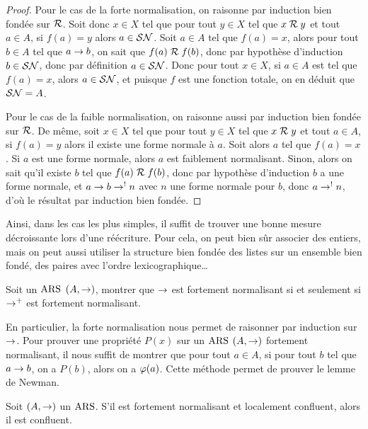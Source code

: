 \begin{proof}
  Pour le cas de la forte normalisation, on raisonne par induction bien
  fondée sur $\mathrel{\mathcal{R}}$. Soit donc $x \in X$ tel que pour tout $y\in X$ tel
  que $x \mathrel{\mathcal{R}} y$ et tout $a \in A$, si $f(a) = y$ alors $a \in \mathcal{SN}$.
  Soit $a \in A$ tel que $f(a) = x$, alors pour tout $b \in A$ tel que
  $a \mathrel{\to} b$, on sait que $f(a)\mathrel{\mathcal{R}} f(b)$, donc par hypothèse
  d'induction $b \in \mathcal{SN}$, donc par définition $a \in \mathcal{SN}$. Donc pour
  tout $x \in X$, si $a \in A$ est tel que $f(a) = x$, alors $a \in \mathcal{SN}$,
  et puisque $f$ est une fonction totale, on en déduit que $\mathcal{SN} = A$.

  Pour le cas de la faible normalisation, on raisonne aussi par
  induction bien fondée sur $\mathrel{\mathcal{R}}$. De même, soit $x \in X$ tel que pour
  tout $y \in X$ tel que $x \mathrel{\mathcal{R}} y$ et tout $a \in A$, si $f(a) = y$
  alors il existe une forme normale à $a$. Soit alors $a$ tel que
  $f(a) = x$. Si $a$ est une forme normale, alors $a$ est faiblement
  normalisant. Sinon, alors on sait qu'il existe $b$ tel que
  $f(a)\mathrel{\mathcal{R}} f(b)$, donc par hypothèse d'induction $b$ a une
  forme normale, et $a \mathrel{\to} b \mathrel{\to}^{\mathord{!}} n$ avec $n$ une forme
  normale pour $b$, donc $a\mathrel{\to}^{\mathord{!}} n$, d'où le résultat par
  induction bien fondée.
\end{proof}

Ainsi, dans les cas les plus simples, il suffit de trouver une bonne mesure
décroissante lors d'une réécriture. Pour cela, on peut bien sûr associer des
entiers, mais on peut aussi utiliser la structure bien fondée des listes sur
un ensemble bien fondé, des paires avec l'ordre lexicographique\ldots

\begin{exercise}
  Soit un $\operatorname{ARS}$ $(A,\mathrel{\to})$, montrer que $\mathrel{\to}$ est fortement normalisant
  si et seulement si $\mathrel{\to}^{\mathord{+}}$ est fortement normalisant.
\end{exercise}

En particulier, la forte normalisation nous permet de raisonner par induction
sur $\mathrel{\to}$. Pour prouver une propriété $P(x)$ sur un $\operatorname{ARS}$ $(A,\mathrel{\to})$
fortement normalisant, il nous suffit de montrer que pour tout $a \in A$, si
pour tout $b$ tel que $a \mathrel{\to} b$, on a $P(b)$, alors on a $\varphi(a)$.
Cette méthode permet de prouver le lemme de Newman.

\begin{lemma}\label{lem.newman}
  Soit $(A,\mathrel{\to})$ un $\operatorname{ARS}$. S'il est fortement normalisant et localement
  confluent, alors il est confluent.
\end{lemma}

